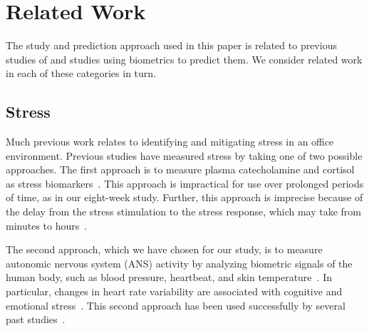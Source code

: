\section{Related Work}


The study and prediction approach used in this paper is related
to previous studies of  and studies
using biometrics to predict them. We consider
related work in each of these categories in turn.



\subsection{Stress}
Much previous work relates to identifying and mitigating stress in an office environment.
Previous studies have measured stress by taking one of two possible approaches.
The first approach is to measure plasma catecholamine and cortisol as stress biomarkers~\cite{piazza10}.
This approach is impractical for use over prolonged periods of time, as in our eight-week study.
Further, this approach is imprecise because of the delay from the stress stimulation to the stress response, which may take from minutes to hours~\cite{Chandola10,Hellhammer09}.

The second approach, which we have chosen for our study, is to measure autonomic nervous system (ANS) activity by analyzing biometric signals of the human body, such as blood pressure, heartbeat, and skin temperature~\cite{kataoka00,Eekelen04,valentini10}.
In particular, changes in heart rate variability are associated with cognitive and emotional stress~\cite{mcduff16,dishman2000stress}.
This second approach has been used successfully by several past studies~\cite{Force96,gal07,montano09}.

